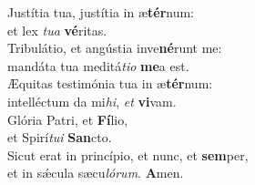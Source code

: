 \evenverse Justítia tua, justítia in æ\textbf{tér}num:~\*\\
\evenverse et lex \textit{tu}\textit{a} \textbf{vé}ritas.\\
\oddverse Tribulátio, et angústia inve\textbf{né}runt me:~\*\\
\oddverse mandáta tua meditá\textit{ti}\textit{o} \textbf{me}a est.\\
\evenverse Æquitas testimónia tua in æ\textbf{tér}num:~\*\\
\evenverse intelléctum da mi\textit{hi}, \textit{et} \textbf{vi}vam.\\
\oddverse Glória Patri, et \textbf{Fí}lio,~\*\\
\oddverse et Spirí\textit{tu}\textit{i} \textbf{San}cto.\\
\evenverse Sicut erat in princípio, et nunc, et \textbf{sem}per,~\*\\
\evenverse et in sǽcula sæcu\textit{ló}\textit{rum}. \textbf{A}men.\\
